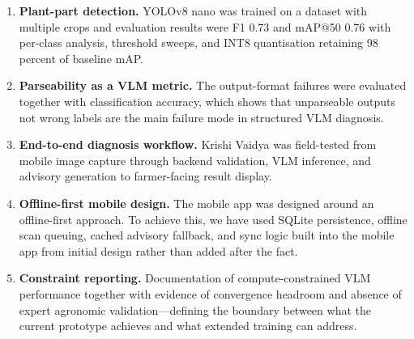 \begin{enumerate}[label=\arabic*.]
\item \textbf{Plant-part detection.} YOLOv8 nano was trained on a dataset with multiple crops
and evaluation results were F1 0.73 and mAP@50 0.76 with per-class analysis,
threshold sweeps, and INT8 quantisation retaining 98 percent of baseline mAP.

\item \textbf{Parseability as a VLM metric.} The output-format failures were
evaluated together with classification accuracy, which shows that unparseable
outputs not wrong labels are the main failure mode in structured VLM
diagnosis.

\item \textbf{End-to-end diagnosis workflow.} Krishi Vaidya was field-tested from mobile
image capture through backend validation, VLM inference, and advisory
generation to farmer-facing result display.

\item \textbf{Offline-first mobile design.} The mobile app was designed around an offline-first approach. To achieve this, we have used SQLite persistence, offline scan
queuing, cached advisory fallback, and sync logic built into the mobile app
from initial design rather than added after the fact.

\item \textbf{Constraint reporting.} Documentation of compute-constrained
VLM performance together with evidence of convergence headroom and absence of expert agronomic validation---defining the
boundary between what the current prototype achieves and what extended
training can address.
\end{enumerate}


